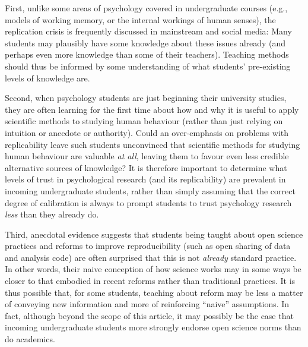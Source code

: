 \documentclass[
  english,
  man,mask,floatsintext]{apa6}
\begin{document}
First, unlike some areas of psychology covered in undergraduate courses (e.g., models of working memory, or the internal workings of human senses), the replication crisis is frequently discussed in mainstream and social media: Many students may plausibly have some knowledge about these issues already (and perhaps even more knowledge than some of their teachers). Teaching methods should thus be informed by some understanding of what students' pre-existing levels of knowledge are.

Second, when psychology students are just beginning their university studies, they are often learning for the first time about how and why it is useful to apply scientific methods to studying human behaviour (rather than just relying on intuition or anecdote or authority). Could an over-emphasis on problems with replicability leave such students unconvinced that scientific methods for studying human behaviour are valuable \emph{at all}, leaving them to favour even less credible alternative sources of knowledge? It is therefore important to determine what levels of trust in psychological research (and its replicability) are prevalent in incoming undergraduate students, rather than simply assuming that the correct degree of calibration is always to prompt students to trust psychology research \emph{less} than they already do.

Third, anecdotal evidence suggests that students being taught about open science practices and reforms to improve reproducibility (such as open sharing of data and analysis code) are often surprised that this is not \emph{already} standard practice. In other words, their naive conception of how science works may in some ways be closer to that embodied in recent reforms rather than traditional practices. It is thus possible that, for some students, teaching about reform may be less a matter of conveying new information and more of reinforcing \enquote{naive} assumptions. In fact, although beyond the scope of this article, it may possibly be the case that incoming undergraduate students more strongly endorse open science norms than do academics.
\end{document}
